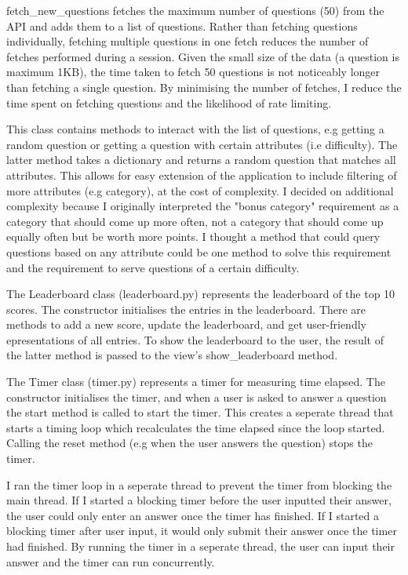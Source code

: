 \documentclass[12pt]{article}
\begin{document}
fetch\_new\_questions fetches the maximum number of questions (50) from the API and adds them to a list of questions. Rather than fetching questions individually, fetching multiple questions in one fetch reduces the number of fetches performed during a session. Given the small size of the data (a question is maximum 1KB), the time taken to fetch 50 questions is not noticeably longer than fetching a single question. By minimising the number of fetches, I reduce the time spent on fetching questions and the likelihood of rate limiting.

This class contains methods to interact with the list of questions, e.g getting a random question or getting a question with certain attributes (i.e difficulty). The latter method takes a dictionary and returns a random question that matches all attributes. This allows for easy extension of the application to include filtering of more attributes (e.g category), at the cost of complexity. I decided on additional complexity because I originally interpreted the "bonus category" requirement as a category that should come up more often, not a category that should come up equally often but be worth more points. I thought a method that could query questions based on any attribute could be one method to solve this requirement and the requirement to serve questions of a certain difficulty. 

\vspace{\baselineskip}

The Leaderboard class (leaderboard.py) represents the leaderboard of the top 10 scores. The constructor initialises the entries in the leaderboard. There are methods to add a new score, update the leaderboard, and get user-friendly epresentations of all entries. To show the leaderboard to the user, the result of the latter method is passed to the view's show\_leaderboard method.

\vspace{\baselineskip}

The Timer class (timer.py) represents a timer for measuring time elapsed. The constructor initialises the timer, and when a user is asked to answer a question the start method is called to start the timer. This creates a seperate thread that starts a timing loop which recalculates the time elapsed since the loop started. Calling the reset method (e.g when the user answers the question) stops the timer.

I ran the timer loop in a seperate thread to prevent the timer from blocking the main thread. If I started a blocking timer before the user inputted their answer, the user could only enter an answer once the timer has finished. If I started a blocking timer after user input, it would only submit their answer once the timer had finished. By running the timer in a seperate thread, the user can input their answer and the timer can run concurrently. 
\end{document}
